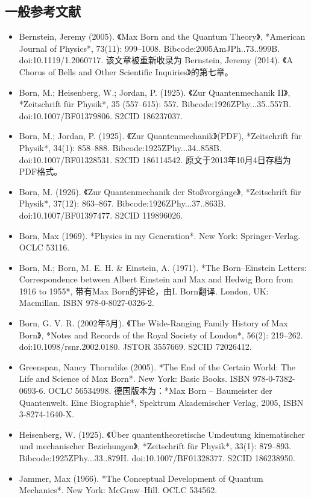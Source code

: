 \subsection{一般参考文献}
\begin{itemize}
\item Bernstein, Jeremy (2005). 《Max Born and the Quantum Theory》, *American Journal of Physics*, 73(11): 999–1008. Bibcode:2005AmJPh..73..999B. doi:10.1119/1.2060717. 该文章被重新收录为 Bernstein, Jeremy (2014). 《A Chorus of Bells and Other Scientific Inquiries》的第七章。
\item Born, M.; Heisenberg, W.; Jordan, P. (1925). 《Zur Quantenmechanik II》, *Zeitschrift für Physik*, 35 (557–615): 557. Bibcode:1926ZPhy...35..557B. doi:10.1007/BF01379806. S2CID 186237037.
\item Born, M.; Jordan, P. (1925). 《Zur Quantenmechanik》(PDF), *Zeitschrift für Physik*, 34(1): 858–888. Bibcode:1925ZPhy...34..858B. doi:10.1007/BF01328531. S2CID 186114542. 原文于2013年10月4日存档为PDF格式。
\item Born, M. (1926). 《Zur Quantenmechanik der Stoßvorgänge》, *Zeitschrift für Physik*, 37(12): 863–867. Bibcode:1926ZPhy...37..863B. doi:10.1007/BF01397477. S2CID 119896026.
\item Born, Max (1969). *Physics in my Generation*. New York: Springer-Verlag. OCLC 53116.
\item Born, M.; Born, M. E. H. & Einstein, A. (1971). *The Born–Einstein Letters: Correspondence between Albert Einstein and Max and Hedwig Born from 1916 to 1955*, 带有Max Born的评论，由I. Born翻译. London, UK: Macmillan. ISBN 978-0-8027-0326-2.
\item Born, G. V. R. (2002年5月). 《The Wide-Ranging Family History of Max Born》, *Notes and Records of the Royal Society of London*, 56(2): 219–262. doi:10.1098/rsnr.2002.0180. JSTOR 3557669. S2CID 72026412.
\item Greenspan, Nancy Thorndike (2005). *The End of the Certain World: The Life and Science of Max Born*. New York: Basic Books. ISBN 978-0-7382-0693-6. OCLC 56534998. 德国版本为：*Max Born – Baumeister der Quantenwelt. Eine Biographie*, Spektrum Akademischer Verlag, 2005, ISBN 3-8274-1640-X.
\item Heisenberg, W. (1925). 《Über quantentheoretische Umdeutung kinematischer und mechanischer Beziehungen》, *Zeitschrift für Physik*, 33(1): 879–893. Bibcode:1925ZPhy...33..879H. doi:10.1007/BF01328377. S2CID 186238950.
\item Jammer, Max (1966). *The Conceptual Development of Quantum Mechanics*. New York: McGraw–Hill. OCLC 534562.

\end{itemize}
